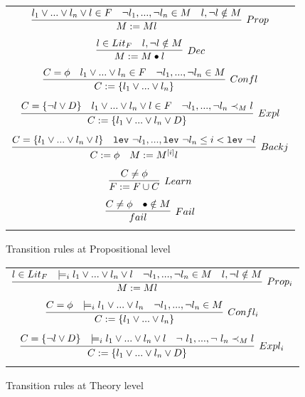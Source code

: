 \documentclass{article}
\begin{document}
	\begin{figure}[t]
	\centering
	\begin{framed}
	\begin{tabular}{c}
		$\infer[Prop]{M := Ml}{l_1 \lor ... \lor 
			l_n \lor l \in F & \neg l_1,...,\neg 
			l_n \in M & l, \neg l \notin M}$ \\ \\
		$\infer[Dec]{M := M \bullet l}{l \in 
			Lit_F & l, \neg l \notin 
			M}$ \\ \\
		$\infer[Confl]{C:=\{l_1 \lor ... \lor 
			l_n\}}{C = \phi & l_1 \lor ... \lor 
			l_n \in F & \neg l_1,...,\neg l_n \in 
			M}$ \\ \\
		$\infer[Expl]{C := \{l_1 \lor ... \lor 
			l_n \lor D\}}{C = \{\neg l \lor D\} & 
			l_1 \lor ... \lor l_n \lor l \in F & 
			\neg l_1,...,\neg l_n \prec_M l}$ \\ \\
		$\infer[Backj]{C := \phi\ \ \ M := M^{[i]}l}
		{C = \{l_1 \lor ... \lor l_n \lor l\} & 
			\texttt{lev}\ \neg l_1, ... , 
			\texttt{lev}\ \neg l_n \leq 
			i < \texttt{lev}\ \neg l}$ \\ \\
		$\infer[Learn]{F := F \cup C}{C \neq 
			\phi}$ \\ \\
		$\infer[Fail]{fail}{C \neq \phi & \bullet 
			\notin M}$ \\ \\
	\end{tabular}
	\end{framed}
	\caption{Transition rules at Propositional level}
	\label{fig:proprules}
	\end{figure}

	\begin{figure}[t]
	\centering
	\begin{framed}
	\begin{tabular}{c}
		$\infer[Prop_i]{M := Ml}{l \in Lit_F 
			 & \models_i l_1 \lor 
			... \lor l_n \lor l & \neg l_1, 
			..., \neg l_n \in M & l,\neg l 
			\notin M}$ \\ \\
		$\infer[Confl_i]{C := \{l_1 \lor ... 
			\lor l_n \}}{C = \phi & \models_i 
			l_1 \lor ... \lor l_n & \neg l_1, 
			..., \neg l_n \in M}$ \\ \\
		$\infer[Expl_i]{C := \{l_1 \lor ... 
			\lor l_n \lor D\}}{C = \{\neg l 
			\lor D\} & \models_i l_1 \lor ... 
			\lor l_n \lor l & \neg\ l_1, ..., 
			\neg\ l_n \prec_M l}$ \\ \\
	\end{tabular}
	\end{framed}
	\caption{Transition rules at Theory level}
		\label{fig:theoryrules}
	\end{figure}
\end{document}
